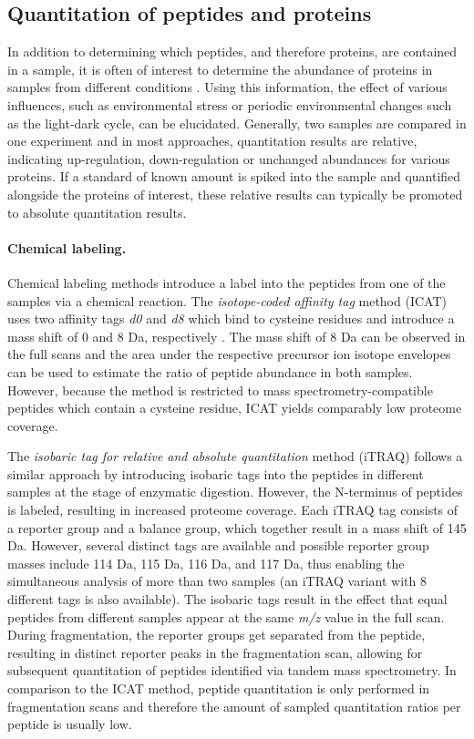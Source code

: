 \subsection{Quantitation of peptides and proteins}

In addition to determining which peptides, and therefore proteins, are 
contained in a sample, it is often of interest to determine the abundance
of proteins in samples from different conditions \citep{Schulze2010}.
Using this information, the effect of various influences, such as environmental 
stress or periodic environmental changes such as the light-dark cycle,
can be elucidated.
Generally, two samples are compared in one experiment and in most approaches, 
quantitation results are relative, indicating up-regulation, down-regulation 
or unchanged abundances for various proteins.
If a standard of known amount is spiked into the sample and quantified alongside
the proteins of interest, these relative results can typically be promoted to 
absolute quantitation results.

\paragraph{Chemical labeling.}

Chemical labeling methods introduce a label into the peptides from one of the 
samples via a chemical reaction. 
The {\em isotope-coded affinity tag} method (ICAT) 
uses two affinity tags {\em d0} and {\em d8} which bind to cysteine residues
and introduce a mass shift of 0 and 8 Da, respectively \citep{Gygi1999}.
The mass shift of 8 Da can be observed in the full scans and the area under
the respective precursor ion isotope envelopes can be used to estimate
the ratio of peptide abundance in both samples.
However, because the method is restricted to mass spectrometry-compatible 
peptides which contain a cysteine residue, ICAT yields comparably low proteome
coverage.

The {\em isobaric tag for relative and absolute quantitation} method (iTRAQ)
follows a similar approach by introducing isobaric tags into the peptides in
different samples \citep{Ross2004} at the stage of enzymatic digestion.
However, the N-terminus of peptides is labeled, resulting in increased proteome
coverage.
Each iTRAQ tag consists of a reporter group and a balance group, which together 
result in a mass shift of 145 Da. 
However, several distinct tags are available and possible reporter group masses 
include 114 Da, 115 Da, 116 Da, and 117 Da, thus enabling the simultaneous 
analysis of more than two samples (an iTRAQ variant with 8 different tags is also
available).
The isobaric tags result in the effect that equal peptides from different 
samples appear at the same {\em m/z} value in the full scan.
During fragmentation, the reporter groups get separated from the peptide, 
resulting in distinct reporter peaks in the fragmentation scan, allowing
for subsequent quantitation of peptides identified via tandem mass spectrometry.
In comparison to the ICAT method, peptide quantitation is only performed in 
fragmentation scans and therefore the amount of sampled quantitation ratios 
per peptide is usually low.

